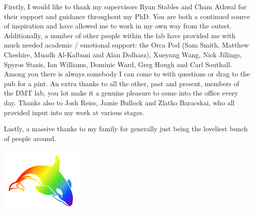 \begin{acknowledgements}
	Firstly, I would like to thank my supervisors Ryan Stables and Cham Athwal for their support and guidance throughout
	my PhD. You are both a continued source of inspiration and have allowed me to work in my own way from the outset.
	Additionally, a number of other people within the lab have provided me with much needed academic / emotional
	support: the Orca Pod (Sam Smith, Matthew Cheshire, Muadh Al-Kalbani and Alan Do\l{}hasz), Xueyang Wang, Nick
	Jillings, Spyros Stasis, Ian Williams, Dominic Ward, Greg Hough and Carl Southall. Among you there is always
	somebody I can come to with questions or drag to the pub for a pint. An extra thanks to all the other, past and
	present, members of the DMT lab, you lot make it a genuine pleasure to come into the office every day. Thanks also
	to Josh Reiss, Jamie Bullock and Zlatko Baracskai, who all provided input into my work at various stages.

	Lastly, a massive thanks to my family for generally just being the loveliest bunch of people around.

	\begin{center}
		\includegraphics[width=0.3\textwidth]{Images/orca.pdf}
	\end{center}
\end{acknowledgements}

\tableofcontents
\listoffigures
\listoftables
{}
\printglossaries
\cleardoublepage
